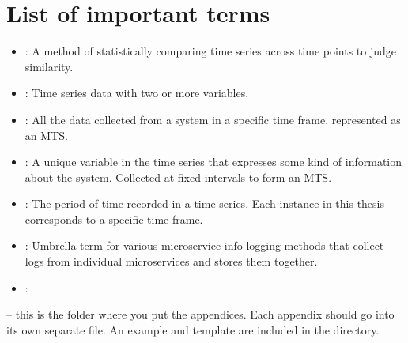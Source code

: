 \section{List of important terms}
\begin{itemize}
\item {}: A method of statistically comparing time series across time points to judge similarity.
\item {}: Time series data with two or more variables.
\item {}: All the data collected from a system in a specific time frame, represented as an MTS.
\item {}: A unique variable in the time series that expresses some kind of information about the system. Collected at fixed intervals to form an MTS.
\item {}: The period of time recorded in a time series. Each instance in this thesis corresponds to a specific time frame.
\item {}: Umbrella term for various microservice info logging methods that collect logs from individual microservices and stores them together. 
\item {}: 
\end{itemize}

 -- this is the folder where you put the appendices. Each appendix should go into its own separate  file. An example and template are included in the directory.


